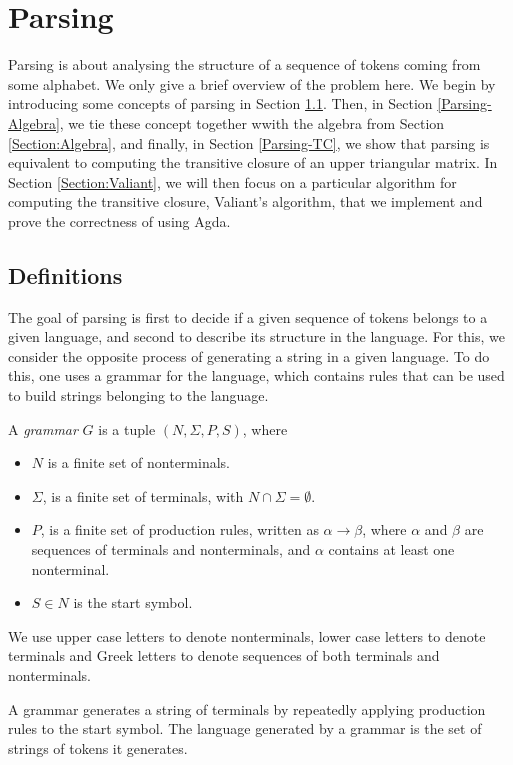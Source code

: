 \newcommand{\productions}{P}
\newcommand{\nonterminals}{N}
\newcommand{\terminals}{\Sigma}
\newcommand{\startsymbol}{S}
\newcommand{\grammar}{(\nonterminals, \terminals, \productions, \startsymbol)}
\section{Parsing}
\label{Parsing}
Parsing is about analysing the structure of a sequence of tokens coming from some alphabet. We only give a brief overview of the problem here.
We begin by introducing some concepts of parsing in Section \ref{Parsing-Defs}. Then, in Section \ref{Parsing-Algebra}, we tie these concept together wwith the algebra from Section \ref{Section:Algebra}, and finally, in Section \ref{Parsing-TC}, we show that parsing is equivalent to computing the transitive closure of an upper triangular matrix.
In Section \ref{Section:Valiant}, we will then focus on a particular algorithm for computing the transitive closure, Valiant's algorithm, that we implement and prove the correctness of using Agda.

\subsection{Definitions}
\label{Parsing-Defs}
The goal of parsing is first to decide if a given sequence of tokens belongs to a given language, and second to describe its structure in the language.
For this, we consider the opposite process of generating a string in a given language. To do this, one uses a grammar for the language, which contains rules that can be used to build strings belonging to the language. %
\begin{Definition}
  A \emph{grammar} $G$ is a tuple $\grammar$, where 
  \begin{itemize}
  \item $\nonterminals$ is a finite set of nonterminals.
  \item $\terminals$, is a finite set of terminals, with $\nonterminals \cap \terminals = \emptyset$.
  \item $\productions$, is a finite set of production rules, written as $\alpha \to \beta$, where $\alpha$ and $\beta$ are sequences of terminals and nonterminals, and $\alpha$ contains at least one nonterminal.
  \item $\startsymbol \in \nonterminals$ is the start symbol.
  \end{itemize}
  We use upper case letters to denote nonterminals, lower case letters to denote terminals and Greek letters to denote sequences of both terminals and nonterminals.
\end{Definition}
A grammar generates a string of terminals by repeatedly applying production rules to the start symbol.
The language generated by a grammar is the set of strings of tokens it generates.

